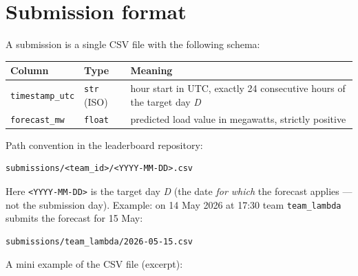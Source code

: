 \documentclass[
  english,
  letterpaper,
]{scrbook}
\newcounter{none} %
\begin{document}
\section{Submission format}\label{submission-format}

A submission is a single CSV file with the following schema:

{\def\LTcaptype{none} %
\begin{longtable}[]{@{}
  >{\raggedright\arraybackslash}p{}
  >{\raggedright\arraybackslash}p{}
  >{\raggedright\arraybackslash}p{}@{}}
\toprule\noalign{}
\begin{minipage}[b]{\linewidth}\raggedright
Column
\end{minipage} & \begin{minipage}[b]{\linewidth}\raggedright
Type
\end{minipage} & \begin{minipage}[b]{\linewidth}\raggedright
Meaning
\end{minipage} \\
\midrule\noalign{}
\endhead
\bottomrule\noalign{}
\endlastfoot
\texttt{timestamp\_utc} & \texttt{str} (ISO) & hour start in UTC,
exactly 24 consecutive hours of the target day \emph{D} \\
\texttt{forecast\_mw} & \texttt{float} & predicted load value in
megawatts, strictly positive \\
\end{longtable}
}

Path convention in the leaderboard repository:

\begin{verbatim}
submissions/<team_id>/<YYYY-MM-DD>.csv
\end{verbatim}

Here \texttt{\textless{}YYYY-MM-DD\textgreater{}} is the target day
\emph{D} (the date \emph{for which} the forecast applies --- not the
submission day). Example: on 14 May 2026 at 17:30 team
\texttt{team\_lambda} submits the forecast for 15 May:

\begin{verbatim}
submissions/team_lambda/2026-05-15.csv
\end{verbatim}

A mini example of the CSV file (excerpt):
\end{document}
